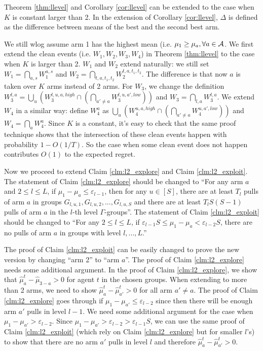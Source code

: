\begin{theorem}
\label{thm:constarm}
Theorem \ref{thm:llevel} and Corollary \ref{cor:llevel} can be extended to the case when $K$ is constant larger than 2. In the extension of Corollary \ref{cor:llevel}, $\Delta$ is defined as the difference between means of the best and the second best arm.
\end{theorem}

We still wlog assume arm 1 has the highest mean (i.e. $\mu_1 \geq \mu_a, \forall a \in \mathcal{A}$. We first extend the clean events (i.e. $W_1,W_2,W_3,W_4$) in Theorem \ref{thm:llevel} to the case when $K$ is larger than 2. $W_1$ and $W_2$ extend naturally: we still set $W_1 = \bigcap_{a,s}W_1^{a,s}$ and $W_2 = \bigcap_{t,a,t_1,t_2} W_2^{t,a,t_1,t_2}$. The difference is that now $a$ is taken over $K$ arms instead of 2 arms. For $W_3$, we change the definition $W_3^{l,a} = \bigcup_u \left(W_3^{l,u,a,high}  \cap \left(\bigcap_{a' \neq a} W_3^{l,u,a',low}\right) \right)$ and $W_3 = \bigcap_{l,a} W_3^{l,a}$. We extend $W_4$ in a similar way: define $W^{a}_4$ as $\bigcup_u \left(W_4^{u,a,high} \cap \left(\bigcap_{a' \neq a} W_4^{u,a',low}\right) \right)$ and $W_4 = \bigcap_a W^a_4$. Since $K$ is a constant, it's easy to check that the same proof technique shows that the intersection of these clean events happen with probability  $1-O(1/T)$. So the case when some clean event does not happen contributes $O(1)$ to the expected regret. 

Now we proceed to extend Claim \ref{clm:l2_explore} and Claim \ref{clm:l2_exploit}. The statement of Claim \ref{clm:l2_explore} should be changed to ``For any arm $a$ and $2\leq l \leq L$, if $\mu_1 - \mu_a \leq \varepsilon_{l-1}$, then for any $u \in [S]$, there are at least $T_l$ pulls of arm $a$ in groups $G_{l,u,1},G_{l,u,2}, ... ,G_{l,u,S}$ and there are at least $T_lS(S-1)$ pulls of arm $a$ in the $l$-th level $\Gamma$-groups''. The statement of Claim \ref{clm:l2_exploit} should be changed to ``For any $2 \leq l \leq L$, if $\varepsilon_{l-1} S\leq \mu_1 - \mu_a < \varepsilon_{l-2} S$, there are no pulls of arm $a$ in groups with level $l,...,L$.'' 

The proof of Claim \ref{clm:l2_exploit} can be easily changed to prove the new version by changing ``arm 2'' to ``arm $a$''. The proof of Claim \ref{clm:l2_explore} needs some additional argument. In the proof of Claim \ref{clm:l2_explore}, we show that $\hat{\mu}_a^t - \hat{\mu}_{3-a} > 0 $ for agent $t$ in the chosen groups. When extending to more than 2 arms, we need to show $\hat{\mu}_a^t - \hat{\mu}_{a'}^t > 0$ for all arm $a' \neq a$. The proof of Claim \ref{clm:l2_explore} goes through if $\mu_1- \mu_{a'} \leq \varepsilon_{l-2}$ since then there will be enough arm $a'$ pulls in level $l-1$. We need some additional argument for the case when $\mu_1 - \mu_{a'} > \varepsilon_{l-2}$. Since $\mu_1- \mu_{a'} > \varepsilon_{l-2} > \varepsilon_{l-1}S$, we can use the same proof of Claim \ref{clm:l2_exploit} (which rely on Claim \ref{clm:l2_explore} but for smaller $l$'s) to show that there are no arm $a'$ pulls in level $l$ and therefore $\hat{\mu}_a^t - \hat{\mu}_{a'}^t > 0$. 


